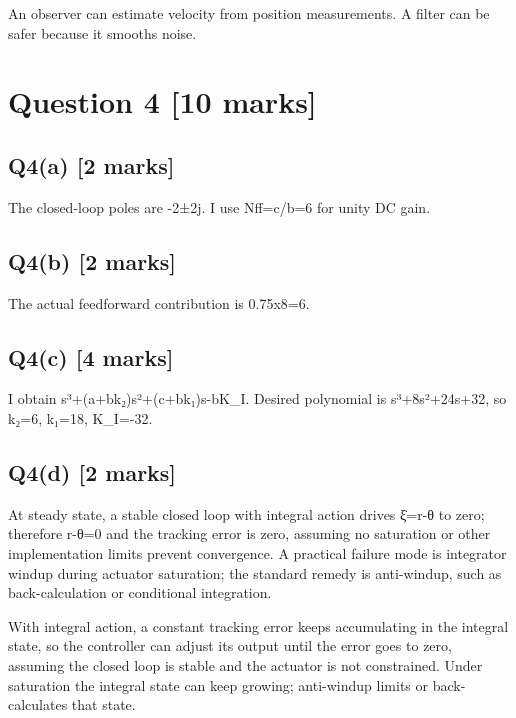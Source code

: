\documentclass[11pt,a4paper]{article}
\begin{document}
An observer can estimate velocity from position measurements.
A filter can be safer because it smooths noise.

\section*{Question 4 \hfill [10 marks]}
\subsection*{Q4(a) \hfill [2 marks]}

The closed-loop poles are -2±2j.
I use Nff=c/b=6 for unity DC gain.

\subsection*{Q4(b) \hfill [2 marks]}

The actual feedforward contribution is 0.75x8=6.

\subsection*{Q4(c) \hfill [4 marks]}

I obtain s³+(a+bk₂)s²+(c+bk₁)s-bK\_I.
Desired polynomial is s³+8s²+24s+32, so k₂=6, k₁=18, K\_I=-32.

\subsection*{Q4(d) \hfill [2 marks]}

At steady state, a stable closed loop with integral action drives ξ̇=r-θ to zero; therefore r-θ=0 and the tracking error is zero, assuming no saturation or other implementation limits prevent convergence.
A practical failure mode is integrator windup during actuator saturation; the standard remedy is anti-windup, such as back-calculation or conditional integration.\par\smallskip With integral action, a constant tracking error keeps accumulating in the integral state, so the controller can adjust its output until the error goes to zero, assuming the closed loop is stable and the actuator is not constrained. Under saturation the integral state can keep growing; anti-windup limits or back-calculates that state.
\end{document}
